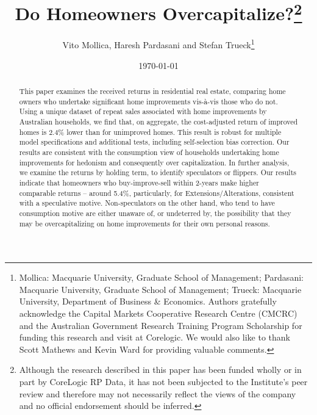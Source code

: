 \documentclass[AEJ,reqno, draftmode]{AEA} %
\begin{document}
\title{Do Homeowners Overcapitalize?\footnote{Although the research described in this paper has been funded wholly or in part by CoreLogic RP Data, it has not been subjected to the Institute's peer review and therefore may not necessarily reflect the views of the company and no official endorsement should be inferred.}}
\author{Vito Mollica, Haresh Pardasani and Stefan Trueck\thanks{%
Mollica: Macquarie University, Graduate School of Management; Pardasani: Macquarie University, Graduate School of Management; Trueck: Macquarie University, Department of Business \& Economics. Authors gratefully acknowledge the Capital Markets Cooperative Research Centre (CMCRC) and the Australian Government Research Training Program Scholarship for funding this research and visit at Corelogic. We would also like to thank Scott Mathews and Kevin Ward for providing valuable comments.}}
\date{\today}
\pubVolume{}
\pubIssue{}


\begin{abstract}
This paper examines the received returns in residential real estate, comparing home owners who undertake significant home improvements vis-à-vis those who do not. Using a unique dataset of repeat sales associated with home improvements by Australian households, we find that, on aggregate, the cost-adjusted return of improved homes is 2.4\% lower than for unimproved homes. This result is robust for multiple model specifications and additional tests, including self-selection bias correction. Our results are consistent with the consumption view of households undertaking home improvements for hedonism and consequently over capitalization. In further analysis, we examine the returns by holding term, to identify speculators or flippers. Our results indicate that homeowners who buy-improve-sell within 2-years make higher comparable returns -- around 5.4\%, particularly, for Extensions/Alterations, consistent with a speculative motive. Non-speculators on the other hand, who tend to have consumption motive are either unaware of, or undeterred by, the possibility that they may be overcapitalizing on home improvements for their own personal reasons.

\end{abstract}
\end{document}
